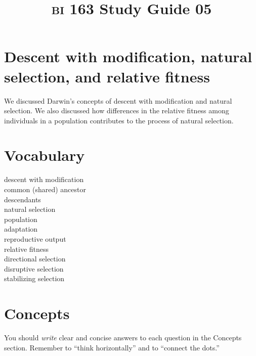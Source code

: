\documentclass[letterpaper]{tufte-handout}
\title{{\scshape bi} 163 Study Guide 05}
\date{} %
\begin{document}
\maketitle	%

\section*{Descent with modification, natural selection, and relative fitness}

We discussed Darwin's concepts of descent with modification and natural selection. We also discussed how differences in the relative fitness among individuals in a population contributes to the process of natural selection.

\section*{Vocabulary}

\vspace{-1\baselineskip}
\begin{multicols}{2}
descent with modification\\
common (shared) ancestor \\
descendants \\
natural selection \\
population \\
adaptation \\
reproductive output \\
relative fitness \\
directional selection\\
disruptive selection\\
stabilizing selection
\end{multicols}

\section*{Concepts}

You should \emph{write} clear and concise answers to each question in the Concepts section.  Remember to ``think horizontally'' and to ``connect the dots.'' 
\end{document}
